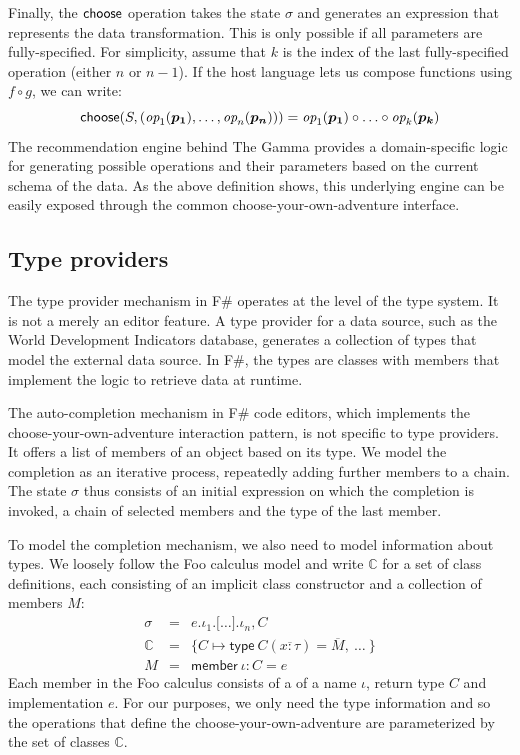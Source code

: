 \documentclass[a4paper,UKenglish,cleveref, autoref, thm-restate]{lipics-v2021}
\newcommand{\ident}[1]{\textsf{#1}}
\newcommand{\select}{\textnormal{\ident{choose}}}
\newcommand{\op}{\textit{op}}
\begin{document}
Finally, the $\select$ operation takes the state $\sigma$ and generates an expression that represents
the data transformation. This is only possible if all parameters are fully-specified. For simplicity,
assume that $k$ is the index of the last fully-specified operation (either $n$ or $n-1$). If the
host language lets us compose functions using $f\circ g$, we can write:
\[
\select(S, (\op_1(\boldsymbol{p_1}), \ldots, \op_n(\boldsymbol{p_n}))) = \op_1(\boldsymbol{p_1}) \circ \ldots \circ \op_k(\boldsymbol{p_k})
\]
The recommendation engine behind The Gamma provides a domain-specific logic for generating
possible operations and their parameters based on the current schema of the data. As the above
definition shows, this underlying engine can be easily exposed through the common
choose-your-own-adventure interface.

\subsection{Type providers}
\label{sec:examples-tps}

The type provider mechanism in F\# operates at the level of the type system. It is not a merely an
editor feature. A type provider for a data source, such as the World Development Indicators database,
generates a collection of types that model the external data source. In F\#, the types are classes
with members that implement the logic to retrieve data at runtime.

The auto-completion mechanism in F\# code editors, which implements the choose-your-own-adventure
interaction pattern, is not specific to type providers. It offers a list of members of an object
based on its type. We model the completion as an iterative process, repeatedly adding further
members to a chain. The state $\sigma$ thus consists of an initial expression on which the
completion is invoked, a chain of selected members and the type of the last member.

To model the completion mechanism, we also need to model information about types. We loosely
follow the Foo calculus model \cite{petricek-2016-fsdata} and write $\mathbb{C}$ for a set
of class definitions, each consisting of an implicit class constructor and a collection of
members $M$:
\[
\begin{array}{rcl}
\sigma &=& e . \iota_1 . \lbrack\ldots\rbrack . \iota_n, C\\
\mathbb{C} &=& \{ C \mapsto \ident{type}~C(\overline{x:\tau}) = \overline{M},~\ldots~ \}\\
M &=& \ident{member}~\iota\!:\!C=e
\end{array}
\]
Each member in the Foo calculus consists of a of a name $\iota$, return type $C$ and implementation
$e$. For our purposes, we only need the type information and so the operations that define the
choose-your-own-adventure are parameterized by the set of classes $\mathbb{C}$.
\end{document}
